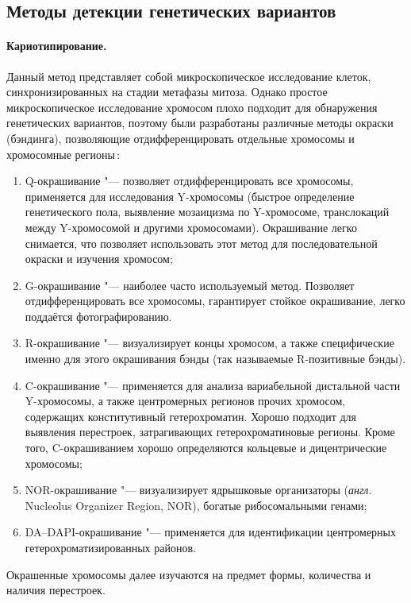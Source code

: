 \documentclass[a4paper,14pt]{extarticle}
\newcommand{\anglia}[1]{\textit{англ.} \textenglish{#1}}
\begin{document}
\subsection{Методы детекции генетических вариантов}

\paragraph{Кариотипирование.}
Данный метод представляет собой микроскопическое исследование клеток, синхронизированных на стадии метафазы митоза.
Однако простое микроскопическое исследование хромосом плохо подходит для обнаружения генетических вариантов, поэтому были разработаны различные методы окраски (бэндинга), позволяющие отдифференцировать отдельные хромосомы и хромосомные регионы\,\cite{Schreck_2001}:

\begin{enumerate}
\item Q-окрашивание "--- позволяет отдифференцировать все хромосомы, применяется для исследования Y-хромосомы (быстрое определение генетического пола, выявление мозаицизма по Y-хромосоме, транслокаций между Y-хромосомой и другими хромосомами).
Окрашивание легко снимается, что позволяет использовать этот метод для последовательной окраски и изучения хромосом;
\item G-окрашивание "--- наиболее часто используемый метод.
Позволяет отдифференцировать все хромосомы, гарантирует стойкое окрашивание, легко поддаётся фотографированию.
\item R-окрашивание "--- визуализирует концы хромосом, а также специфические именно для этого окрашивания бэнды (так называемые R\hyp{}позитивные бэнды).
\item C-окрашивание "--- применяется для анализа вариабельной дистальной части Y-хромосомы, а также центромерных регионов прочих хромосом, содержащих конститутивный гетерохроматин.
Хорошо подходит для выявления перестроек, затрагивающих гетерохроматиновые регионы.
Кроме того, C-окрашиванием хорошо определяются кольцевые и дицентрические хромосомы;
\item NOR-окрашивание "--- визуализирует ядрышковые организаторы (\anglia{Nucleolus Organizer Region, NOR}), богатые рибосомальными генами;
\item DA--DAPI-окрашивание "--- применяется для идентификации центромерных гетерохроматизированных районов.
\end{enumerate}

Окрашенные хромосомы далее изучаются на предмет формы, количества и наличия перестроек.
\end{document}
